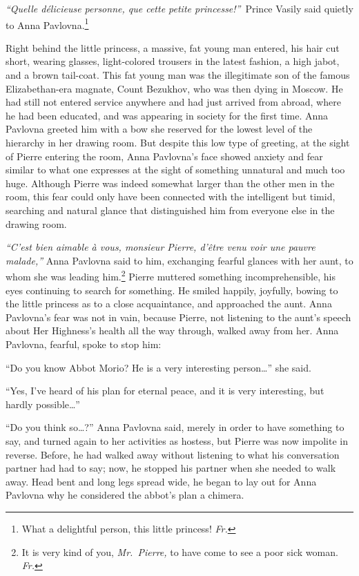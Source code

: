 \textit{``Quelle d\'elicieuse personne, que cette petite princesse!''}~Prince Vasily said quietly to Anna Pavlovna.\footnote{What a delightful person, this little princess! \textit{Fr.}} %

Right behind the little princess, a massive, fat young man entered, his hair cut short, wearing glasses, light-colored trousers in the latest fashion, a high jabot, and a brown tail-coat. This fat young man was the illegitimate son of the famous Elizabethan-era magnate, Count Bezukhov, who was then dying in Moscow. He had still not entered service anywhere and had just arrived from abroad, where he had been educated, and was appearing in society for the first time. Anna Pavlovna greeted him with a bow she reserved for the lowest level of the hierarchy in her drawing room. But despite this low type of greeting, at the sight of Pierre entering the room, Anna Pavlovna's face showed anxiety and fear similar to what one expresses at the sight of something unnatural and much too huge. Although Pierre was indeed somewhat larger than the other men in the room, this fear could only have been connected with the intelligent but timid, searching and natural glance that distinguished him from everyone else in the drawing room.

\textit{``C'est bien aimable \`a vous, \emph{monsieur Pierre,} d'\^etre venu voir une pauvre malade,''} Anna Pavlovna said to him, exchanging fearful glances with her aunt, to whom she was leading him.\footnote{It is very kind of you, \emph{Mr.~Pierre,} to have come to see a poor sick woman. \textit{Fr.}} Pierre muttered something incomprehensible, his eyes continuing to search for something. He smiled happily, joyfully, bowing to the little princess as to a close acquaintance, and approached the aunt. Anna Pavlovna's fear was not in vain, because Pierre, not listening to the aunt's speech about Her Highness's health all the way through, walked away from her. Anna Pavlovna, fearful, spoke to stop him: %

``Do you know Abbot Morio? He is a very interesting person\ldots{}'' she said. %

``Yes, I've heard of his plan for eternal peace, and it is very interesting, but hardly possible\ldots{}'' %

``Do you think so\ldots{}?'' Anna Pavlovna said, merely in order to have something to say, and turned again to her activities as hostess, but Pierre was now impolite in reverse. Before, he had walked away without listening to what his conversation partner had had to say; now, he stopped his partner when she needed to walk away. Head bent and long legs spread wide, he began to lay out for Anna Pavlovna why he considered the abbot's plan a chimera. %

